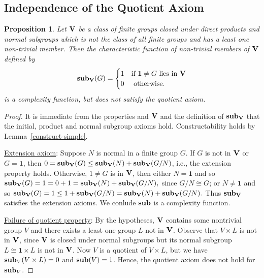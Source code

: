 \documentclass[a4paper,11pt]{amsart}
\newtheorem{proposition}[theorem]{Proposition}
\theoremstyle{definition}
\newcommand{\1}{{\mathbf 1}}
\newcommand{\subS}{{\bf sub}}
\newcommand{\V}{{\bf V}}
\begin{document}
\subsection{Independence of the Quotient Axiom}

\begin{proposition}\label{quo-indep}
Let $\V$ be a class of finite groups closed under direct products and normal subgroups which is not the class of all finite groups and has a least one non-trivial member.  
 Then the {\em characteristic function of non-trivial members of $\V$} defined by 
$$\subS_\V(G)
   = \begin{cases}
      1 &  \mbox{if $\1 \neq G$ lies in $\V$}\\
      0      & \mbox{ otherwise.}
    \end{cases}$$
is a complexity function, but does  {\em not} satisfy the 
quotient axiom. 
\end{proposition}
\begin{proof} It is immediate from the properties and $\V$ and the definition of $\subS_\V$  that the initial, product   and normal subgroup axioms hold.  Constructability holds by Lemma~\ref{construct-simple}.


\underline{Extension axiom}: 
Suppose $N$ is normal in a finite group $G$. 
If $G$ is not in $\V$ or $G=\1$, then $0= \subS_\V(G) \leq \subS_\V(N)+ \subS_\V(G/N)$, i.e., the extension property  holds.
Otherwise,  $1\neq G$ is in $\V$,  
then either $N=\1$ and so $\subS_\V(G)= 1 = 0 + 1=  \subS_\V(N)+ \subS_\V(G/N),$ since $G/N\cong G$;  or 
$N\neq \1$ and so  $\subS_\V (G)=1 \leq 1+  \subS_\V(G/N) = \subS_\V(N) +  \subS_\V(G/N).$   
Thus $\subS_\V$ satisfies the extension axioms.   We conlude $\subS$ is a complexity function.

\underline{Failure of quotient property}:  By the hypotheses, $\V$ contains some nontrivial group $V$ and 
there exists a least one group $L$ not in $\V$.
Observe that  $V \times L$ is not in $\V$, since  $\V$ is closed under normal subgroups but its normal subgroup $L \cong \1 \times L$ is not in $\V$.  Now $V$ is a quotient of $V\times L$, but we have
$\subS_V(V\times L)=0$ and $\subS(V)=1$. 
Hence, the quotient axiom does not hold for $\subS_V$. 
\end{proof}
\end{document}
